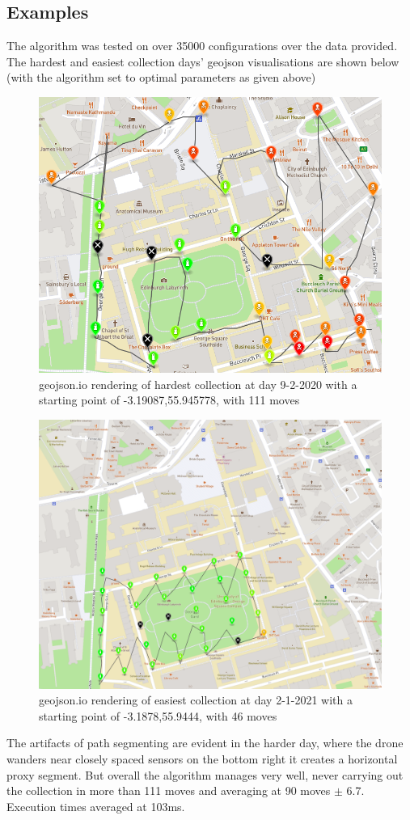 \documentclass[10pt,a4paper]{article}
\begin{document}
\subsection{Examples}
The algorithm was tested on over 35000 configurations over the data provided. 
The hardest and easiest collection days' geojson visualisations are shown below (with the algorithm set to optimal parameters as given above) 
\begin{figure}[H]
    \centering
    \includegraphics[width=0.6\columnwidth]{diagrams/hard-day.png}
    \caption{geojson.io rendering of hardest collection at day 9-2-2020 with a starting point of -3.19087,55.945778, with 111 moves}
    \label{fig:simulation}
\end{figure}
\begin{figure}[H]
    \centering
    \includegraphics[width=0.6\columnwidth]{diagrams/easy-day.png}
    \caption{geojson.io rendering of easiest collection at day 2-1-2021 with a starting point of -3.1878,55.9444, with 46 moves}
    \label{fig:simulation}
\end{figure}

The artifacts of path segmenting are evident in the harder day, where the drone wanders near closely spaced sensors on the bottom right it creates a horizontal 
proxy segment. But overall the algorithm manages very well, never carrying out the collection in more than 111 moves and averaging at 90 moves $\pm$ 6.7. Execution times averaged at 103ms.
\end{document}

